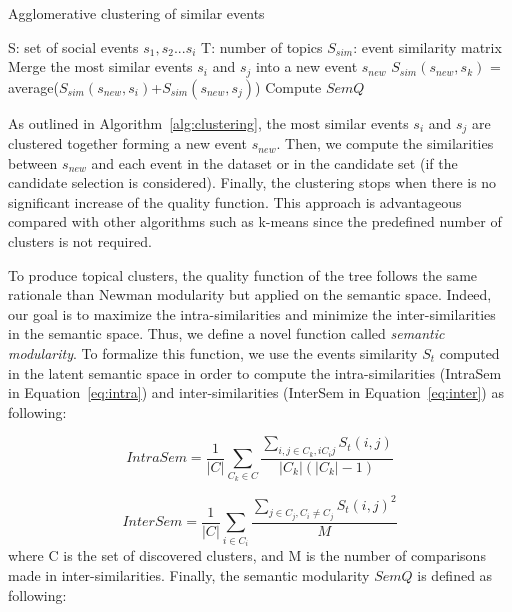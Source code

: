 \begin{algorithm}
\caption{Agglomerative clustering of similar events}
\label{alg:clustering}
\begin{algorithmic}
\STATE S: set of social events $s_1, s_2...s_i$
\STATE T: number of topics
\STATE $S_{sim}$: event similarity matrix
	   \STATE Merge the most similar events $s_i$ and $s_j$ into a new event $s_{new}$
 			\STATE $S_{sim}(s_{new},s_k)$ =  average($S_{sim}(s_{new},s_i)$+$S_{sim}(s_{new},s_j)$)
		\ENDFOR
\STATE Compute $SemQ$		
\ENDWHILE
\end{algorithmic}
\end{algorithm}

As outlined in Algorithm~\ref{alg:clustering}, the most similar events $s_i$ and $s_j$ are clustered together forming a new event $s_{new}$. Then, we compute the similarities between $s_{new}$ and each event in the dataset or in the candidate set (if the candidate selection is considered). Finally, the clustering stops when there is no significant increase of the quality function. This approach is advantageous compared with other algorithms such as k-means since the predefined number of clusters is not required.

To produce topical clusters, the quality function of the tree follows the same rationale than Newman modularity but applied on the semantic space. Indeed, our goal is to maximize the intra-similarities and minimize the inter-similarities in the semantic space. Thus, we define a novel function called \textit{semantic modularity}. To formalize this function, we use the events similarity  $S_t$ computed in the latent semantic space in order to compute the intra-similarities (IntraSem in Equation~\ref{eq:intra}) and inter-similarities (InterSem in Equation~\ref{eq:inter}) as following:

\begin{equation} \label{eq:intra}
       {IntraSem}=\frac{1}{|C|}\sum_{C_k \in C} \frac{\sum_{i,j \in C_k, i  C_i j } S_t(i,j)}{|C_k| (|C_k|-1)} 
\end{equation}

 \begin{equation} \label{eq:inter}
      {InterSem}=  \frac{1}{|C|} \sum_{i \in C_i} \frac{\sum_{j \in C_j,  C_i \ne  C_j} S_t(i,j)^2}{M}  
\end{equation}
where C is the set of discovered clusters, and M is the number of comparisons made in inter-similarities. Finally, the semantic modularity $SemQ$ is defined as following:

